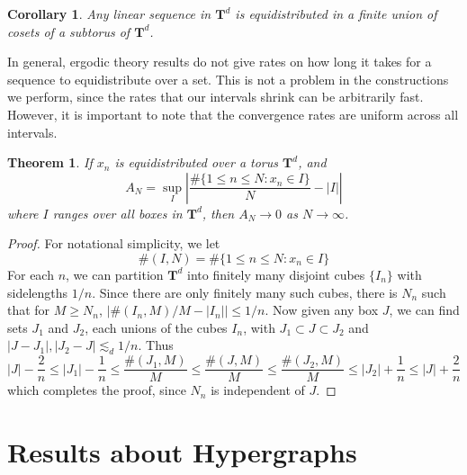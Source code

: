 \documentclass{report}
\theoremstyle{plain}
\newtheorem*{corollary}{Corollary}
\theoremstyle{plain}
\newtheorem{theorem}{Theorem}
\begin{document}
\begin{corollary}
    Any linear sequence in $\mathbf{T}^d$ is equidistributed in a finite union of cosets of a subtorus of $\mathbf{T}^d$.
\end{corollary}

In general, ergodic theory results do not give rates on how long it takes for a sequence to equidistribute over a set. This is not a problem in the constructions we perform, since the rates that our intervals shrink can be arbitrarily fast. However, it is important to note that the convergence rates are uniform across all intervals.

\begin{theorem}
    If $x_n$ is equidistributed over a torus $\mathbf{T}^d$, and
    \[ A_N = \sup_I \left| \frac{\# \{ 1 \leq n \leq N : x_n \in I \}}{N} - |I| \right| \]
    where $I$ ranges over all boxes in $\mathbf{T}^d$, then $A_N \to 0$ as $N \to \infty$.
\end{theorem}
\begin{proof}
    For notational simplicity, we let
    \[ \# (I,N) = \# \{ 1 \leq n \leq N: x_n \in I \} \]
    For each $n$, we can partition $\mathbf{T}^d$ into finitely many disjoint cubes $\{ I_n \}$ with sidelengths $1/n$. Since there are only finitely many such cubes, there is $N_n$ such that for $M \geq N_n$, $| \#(I_n,M)/M - |I_n|| \leq 1/n$. Now given any box $J$, we can find sets $J_1$ and $J_2$, each unions of the cubes $I_n$, with $J_1 \subset J \subset J_2$ and $|J - J_1|, |J_2 - J| \lesssim_d 1/n$. Thus
    \[ |J| - \frac{2}{n} \leq |J_1| - \frac{1}{n} \leq \frac{\#(J_1,M)}{M} \leq \frac{\#(J,M)}{M} \leq \frac{\#(J_2,M)}{M} \leq |J_2| + \frac{1}{n} \leq |J| + \frac{2}{n} \]
    which completes the proof, since $N_n$ is independent of $J$.
\end{proof}








\section{Results about Hypergraphs}
\end{document}
